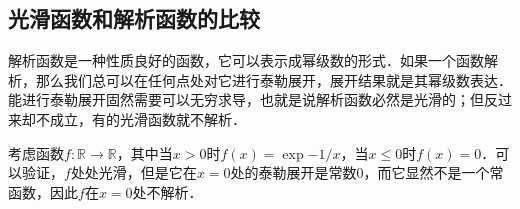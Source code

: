 \subsection{光滑函数和解析函数的比较}

解析函数是一种性质良好的函数，它可以表示成幂级数的形式．如果一个函数解析，那么我们总可以在任何点处对它进行泰勒展开，展开结果就是其幂级数表达．能进行泰勒展开固然需要可以无穷求导，也就是说解析函数必然是光滑的；但反过来却不成立，有的光滑函数就不解析．

\begin{example}{}
考虑函数$f:\mathbb{R}\rightarrow\mathbb{R}$，其中当$x>0$时$f(x)=\exp{-1/x}$，当$x\leq 0$时$f(x)=0$．可以验证，$f$处处光滑，但是它在$x=0$处的泰勒展开是常数$0$，而它显然不是一个常函数，因此$f$在$x=0$处不解析．
\end{example}



